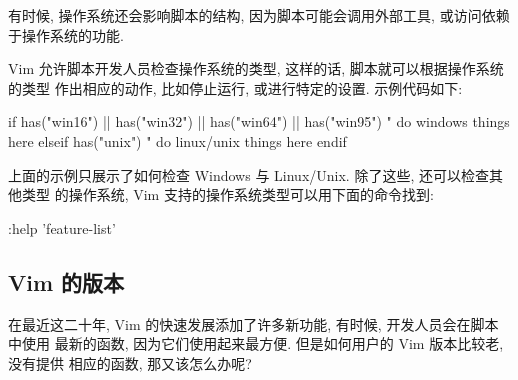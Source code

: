 有时候, 操作系统还会影响脚本的结构, 因为脚本可能会调用外部工具, 或访问依赖
于操作系统的功能.

Vim 允许脚本开发人员检查操作系统的类型, 这样的话, 脚本就可以根据操作系统的类型
作出相应的动作, 比如停止运行, 或进行特定的设置. 示例代码如下:
\begin{vimcode}
if has("win16") || has("win32") || has("win64") || has("win95")
	" do windows things here
elseif has("unix")
	" do linux/unix things here
endif
\end{vimcode}
上面的示例只展示了如何检查 Windows 与 Linux/Unix. 除了这些, 还可以检查其他类型
的操作系统, Vim 支持的操作系统类型可以用下面的命令找到:
\begin{vimcode}
:help 'feature-list'
\end{vimcode}

\subsection{Vim 的版本}
\label{subsec:which_version_of_vim}

在最近这二十年, Vim 的快速发展添加了许多新功能, 有时候, 开发人员会在脚本中使用
最新的函数, 因为它们使用起来最方便. 但是如何用户的 Vim 版本比较老, 没有提供
相应的函数, 那又该怎么办呢?
